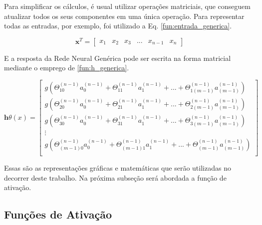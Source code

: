 Para simplificar os cálculos, é usual utilizar operações matriciais, que conseguem atualizar todos os seus componentes em uma única operação. Para representar todas as entradas, por exemplo, foi utilizado a Eq. \ref{fun:entrada_generica}.


\begin{equation}
    \label{fun:entrada_generica}
  \mathbf{x}^T = \begin{bmatrix}x_{1}&x_{2}&x_{3}&...&x_{n-1}&x_{n}\end{bmatrix}
\end{equation}

E a resposta da Rede Neural Genérica pode ser escrita na forma matricial mediante o emprego de \eqref{fun:h_generica}.

 \begin{equation}
   \label{fun:h_generica}
   \mathbf{h}\theta(x) = 
   \begin{bmatrix}
   g(\Theta^{(n-1)}_{10}a^{(n-1)}_{0}+\Theta^{(n-1)}_{11}a^{(n-1)}_{1}+ ... +\Theta^{(n-1)}_{1(m-1)}a^{(n-1)}_{(m-1)} )\\
   g(\Theta^{(n-1)}_{20}a^{(n-1)}_{0}+\Theta^{(n-1)}_{21}a^{(n-1)}_{1}+ ... +\Theta^{(n-1)}_{2(m-1)}a^{(n-1)}_{(m-1)} )\\
   g(\Theta^{(n-1)}_{30}a^{(n-1)}_{0}+\Theta^{(n-1)}_{31}a^{(n-1)}_{1}+ ... +\Theta^{(n-1)}_{3(m-1)}a^{(n-1)}_{(m-1)} )\\
    \vdots\\
    g(\Theta^{(n-1)}_{(m-1)0}a^{(n-1)}_{0}+\Theta^{(n-1)}_{(m-1)1}a^{(n-1)}_{1}+ ... +\Theta^{(n-1)}_{(m-1)}a^{(n-1)}_{(m-1)} )\\
    
   \end{bmatrix} 
\end{equation}


Essas são as representações gráficas e matemáticas que serão utilizadas no decorrer deste trabalho. Na próxima subseção será abordada a função de ativação.

\subsection{Funções de Ativação}
\label{sec:funcaoativacao}

\cite{activationfun}


